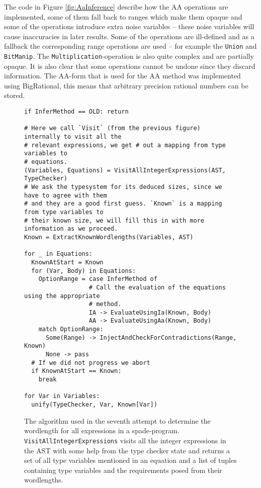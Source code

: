The code in Figure \ref{fig:AaInference} describe how the AA operations are implemented, some of them fall back to ranges which make them opaque and some of the operations introduce extra noise variables -- these noise variables will cause inaccuracies in later results. Some of the operations are ill-defined and as a fallback the corresponding range operations are used -- for example the \verb+Union+ and \verb+BitManip+. The \verb+Multiplication+-operation is also quite complex and are partially opaque. It is also clear that some operations cannot be undone since they discard information. The AA-form that is used for the AA method was implemented using BigRational, this means that arbitrary precision rational numbers can be stored. 

\begin{figure}[h!]
\begin{verbatim}
if InferMethod == OLD: return

# Here we call `Visit` (from the previous figure) internally to visit all the
# relevant expressions, we get # out a mapping from type variables to
# equations.
(Variables, Equations) = VisitAllIntegerExpressions(AST, TypeChecker)
# We ask the typesystem for its deduced sizes, since we have to agree with them
# and they are a good first guess. `Known` is a mapping from type variables to
# their known size, we will fill this in with more information as we proceed.
Known = ExtractKnownWordlengths(Variables, AST)

for _ in Equations:
  KnownAtStart = Known
  for (Var, Body) in Equations:
    OptionRange = case InferMethod of
                  # Call the evaluation of the equations using the appropriate
                  # method.
                  IA -> EvaluateUsingIa(Known, Body)
                  AA -> EvaluateUsingAa(Known, Body)
    match OptionRange:
      Some(Range) -> InjectAndCheckForContradictions(Range, Known)
      None -> pass
  # If we did not progress we abort
  if KnownAtStart == Known:
    break

for Var in Variables:
  unify(TypeChecker, Var, Known[Var])
\end{verbatim}
  \cprotect\caption{The algorithm used in the seventh attempt to determine the wordlength for all expressions in a spade-program. \verb+VisitAllIntegerExpressions+ visits all the integer expressions in the AST with some help from the type checker state and returns a set of all type variables mentioned in an equation and a list of tuples containing type variables and the requirements posed from their wordlengths.}
\label{fig:WLIAlgo}
\end{figure}

